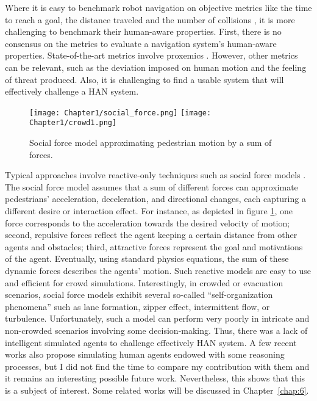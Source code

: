 Where it is easy to benchmark robot navigation on objective metrics like the time to reach a goal, the distance traveled and the number of collisions \cite{perille2020benchmarking}, it is more challenging to benchmark their human-aware properties.
First, there is no consensus on the metrics to evaluate a navigation system's human-aware properties. State-of-the-art metrics involve proxemics \cite{samarakoon2022review}. However, other metrics can be relevant, such as the deviation imposed on human motion and the feeling of threat produced.
Also, it is challenging to find a usable system that will effectively challenge a HAN system. 

\begin{figure}
    \center
    \texttt{[image: Chapter1/social\_force.png]}
    \texttt{[image: Chapter1/crowd1.png]}
    \caption{Social force model approximating pedestrian motion by a sum of forces.}
    \label{fig:social_force_model}
\end{figure}

Typical approaches involve reactive-only techniques such as social force models \cite{helbing1995social,chen_social_2018}. 
The social force model assumes that a sum of different forces can approximate pedestrians' acceleration, deceleration, and directional changes, each capturing a different desire or interaction effect. For instance, as depicted in figure \ref{fig:social_force_model}, one force corresponds to the acceleration towards the desired velocity of motion; second, repulsive forces reflect the agent keeping a certain distance from other agents and obstacles; third, attractive forces represent the goal and motivations of the agent. Eventually, using standard physics equations, the sum of these dynamic forces describes the agents' motion.
Such reactive models are easy to use and efficient for crowd simulations. Interestingly, in crowded or evacuation scenarios, social force models exhibit several so-called ``self-organization phenomena'' such as lane formation, zipper effect, intermittent flow, or turbulence.
Unfortunately, such a model can perform very poorly in intricate and non-crowded scenarios involving some decision-making. Thus, there was a lack of intelligent simulated agents to challenge effectively HAN system.
A few recent works also propose simulating human agents endowed with some reasoning processes, but I did not find the time to compare my contribution with them and it remains an interesting possible future work. Nevertheless, this shows that this is a subject of interest. Some related works will be discussed in Chapter~\ref{chap:6}.
